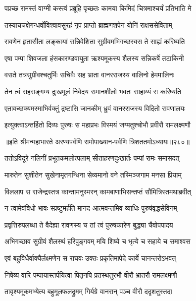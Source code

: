 \twolineshloka
{पप्रच्छ रामस्तं वाग्मी कस्त्वं प्रब्रूहि पृच्छतः}
{कामया किमिदं चित्रमाश्चर्यं प्रतिभाति मे}


\twolineshloka
{तस्याचचक्षेगन्धर्वोविश्वावसुरहं नृप}
{प्राप्तो ब्राह्मणशपेन योनिं राक्षससेविताम्}


\twolineshloka
{रावणेन हृतासीता लङ्कायां सन्निवेशिता}
{सुग्रीवमभिगच्छस्वस ते साह्यं करिष्यति}


\twolineshloka
{एषा पम्पा शिवजला हंसकारण्डवायुता}
{ऋश्यमूकस्य शैलस्य सन्निकर्षे तटाकिनी}


\twolineshloka
{वसते तत्रसुग्रीवश्चतुर्भिः सचिवैः सह}
{भ्राता वानरराजस्य वालिनो हेममालिनः}


\twolineshloka
{तेन त्वं सहसङ्गम्य दुःखमूलं निवेदय}
{समानशीलो भवतः साहाय्यं स करिष्यति}


\twolineshloka
{एतावच्छक्यमस्माभिर्वक्तुं द्रष्टासि जानकीम्}
{ध्रुवं वानरराजस्य विदितो रावणालयः}


\twolineshloka
{इत्युक्त्वाऽन्तर्हितो दिव्यः पुरुषः स महाप्रभः}
{विस्मयं जग्मतुश्चोभौ प्रवीरौ रामलक्ष्मणौ}


॥इति श्रीमन्महाभारते अरण्यपर्वणि रामोपाख्यान-पर्वणि त्रिशततमोऽध्यायः॥२८०॥

\storymeta

\resetShloka



\twolineshloka
{ततोऽविदूरे नलिनीं प्रभूतकमलोत्पलाम्}
{सीताहरणदुःखार्तः पम्पां रामः समासदत्}


\twolineshloka
{मारुतेन सुशीतेन सुखेनामृतगन्धिना}
{सेव्यमानो वने तस्मिञ्जगाम मनसा प्रियाम्}


\twolineshloka
{विललाप स राजेन्द्रस्तत्र कान्तामनुस्मरन्}
{कामबाणाभिसन्तप्तं सौमित्रिस्तमथाब्रवीत्}


\twolineshloka
{न त्वामेवंविधो भावः स्प्रष्टुमर्हति मानद}
{आत्मवन्तमिव व्याधिः पुरुषंवृद्धसेविनम्}


\twolineshloka
{प्रवृत्तिरुपलब्धा ते वैदेह्या रावणस्य च}
{तां त्वं पुरुषकारेण बुद्ध्या चैवोपपादय}


\twolineshloka
{अभिगच्छाव सुग्रीवं शैलस्थं हरिपुङ्गवम्}
{मयि शिष्ये च भृत्ये च सहाये च समाश्वस}


\twolineshloka
{एवं बहुविधैर्वाक्यैर्लक्ष्मणेन स राघवः}
{उक्तः प्रकृतिमापेदे कार्ये चानन्तरोऽभवत्}


\twolineshloka
{निषेव्य वारि पम्पायास्तर्पयित्वा पितृनपि}
{प्रतस्थतुरभौ वीरौ भ्रातरौ रामलक्ष्मणौ}


\twolineshloka
{तावृश्यमूकमभ्येत्य बहुमूलफलद्रुमम्}
{गिर्यग्रे वानरान् पञ्च वीरौ ददृशतुस्तदा}


